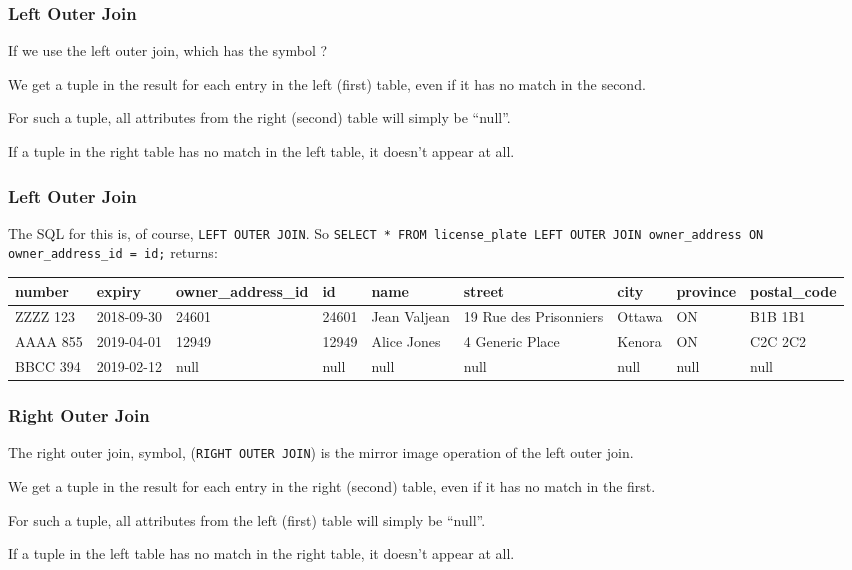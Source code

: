 \begin{frame}
\frametitle{Left Outer Join}

If we use the left outer join, which has the symbol {\tiny {}}? 

We get a tuple in the result for each entry in the left (first) table, even if it has no match in the second. 

For such a tuple, all attributes from the right (second) table will simply be ``null''. 

If a tuple in the right table has no match in the left table, it doesn't appear at all.


\end{frame}



\begin{frame}
\frametitle{Left Outer Join}

The SQL for this is, of course, \texttt{LEFT OUTER JOIN}. So \texttt{SELECT * FROM license\_plate LEFT OUTER JOIN owner\_address ON owner\_address\_id = id;} returns:

{\tiny
\begin{center}
	\begin{tabular}{|l|l|l|l|l|l|l|l|l|}\hline
		\textbf{number} & \textbf{expiry} & \textbf{owner\_address\_id} & \textbf{id} & \textbf{name} &\textbf{street} & \textbf{city} & \textbf{province} & \textbf{postal\_code} \\ \hline
		ZZZZ 123 & 2018-09-30 & 24601 & 24601 & Jean Valjean & 19 Rue des Prisonniers & Ottawa & ON & B1B 1B1\\ \hline
		AAAA 855 & 2019-04-01 & 12949 & 12949 & Alice Jones & 4 Generic Place & Kenora & ON & C2C 2C2\\ \hline
		BBCC 394 & 2019-02-12 & null & null & null & null & null & null & null \\ \hline
	\end{tabular}
\end{center}
}


\end{frame}



\begin{frame}
\frametitle{Right Outer Join}


The right outer join, symbol, {\tiny {}} (\texttt{RIGHT OUTER JOIN}) is the mirror image operation of the left outer join. 

We get a tuple in the result for each entry in the right (second) table, even if it has no match in the first. 

For such a tuple, all attributes from the left (first) table will simply be ``null''. 

If a tuple in the left table has no match in the right table, it doesn't appear at all.


\end{frame}




